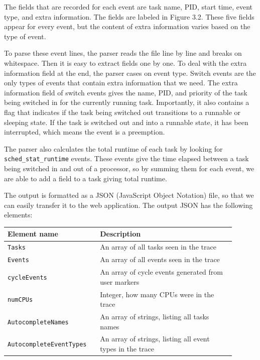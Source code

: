 \documentclass{hmcclinic}
\begin{document}
  The fields that are recorded for each event are task name, PID, start time, 
  event type, and extra information. The fields are labeled in Figure 3.2. 
These five fields appear for every event, but the content of extra information
  varies based on the type of event.

  To parse these event lines, the parser reads the file line by line and breaks on
  whitespace. Then it is easy to extract fields one by one. To deal with the
  extra information field at the end, the parser cases on event type. Switch events
  are the only types of events that contain extra information that we need.  The
  extra information field of switch events gives the name, PID, and priority of
  the task being switched in for the currently running task. Importantly, it
  also contains a flag that indicates if the task being switched out transitions
  to a runnable or sleeping state. If the task is switched out and into a
  runnable state, it has been interrupted,  which means the event is a preemption.

  The parser also calculates the total runtime of each task by looking for
\texttt{sched\_stat\_runtime} events. These events give the time elapsed between
  a task being switched in and out of a processor, so by summing them for 
  each event, we are able to add a field to a task giving total runtime.

  The output is formatted as a JSON (JavaScript Object Notation) file, so that we can easily transfer it to
  the web application. The output JSON has the following elements:

  \begin{center}
    \begin{tabular}{p{0.35\linewidth}p{0.55\linewidth}}
      \toprule
      Element name        & Description\\
      \midrule
      \texttt{Tasks}      & An array of all tasks seen in the trace\\
       \texttt{Events}     & An array of all events seen in the trace\\
       \texttt{cycleEvents} & An array of cycle events generated from user markers\\
       \texttt{numCPUs}     & Integer, how many CPUs were in the trace\\
       \texttt{AutocompleteNames} & An array of strings, listing all tasks names\\
       \texttt{AutocompleteEventTypes} & An array of strings, listing all event types in the trace\\
      \bottomrule
    \end{tabular}
  \end{center}
\end{document}
